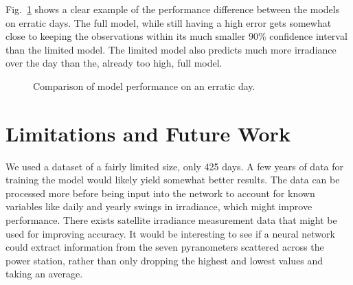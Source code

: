 Fig.~\ref{fig:disc_high} shows a clear example of the performance difference between the models on erratic days. The full model, while still having a high error gets somewhat close to keeping the observations within its much smaller 90\% confidence interval than the limited model. The limited model also predicts much more irradiance over the day than the, already too high, full model.
\begin{figure}[ht!]
    \centering
    \qquad
    \qquad
    \caption{Comparison of model performance on an erratic day.
    \label{fig:disc_high}}
\end{figure}



\section{Limitations and Future Work}
We used a dataset of a fairly limited size, only 425 days. A few years of data for training the model would likely yield somewhat better results. The data can be processed more before being input into the network to account for known variables like daily and yearly swings in irradiance, which might improve performance. There exists satellite irradiance measurement data that might be used for improving accuracy. It would be interesting to see if a neural network could extract information from the seven pyranometers scattered across the power station, rather than only dropping the highest and lowest values and taking an average. 

